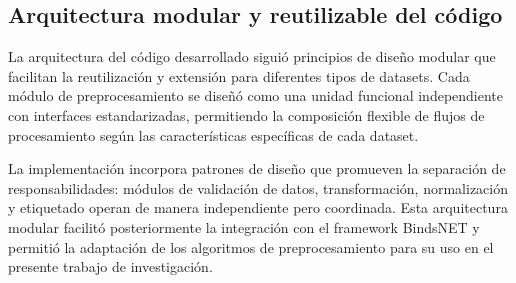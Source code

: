 \subsection{Arquitectura modular y reutilizable del código}

La arquitectura del código desarrollado siguió principios de diseño modular que facilitan la reutilización y extensión para diferentes tipos de datasets. Cada módulo de preprocesamiento se diseñó como una unidad funcional independiente con interfaces estandarizadas, permitiendo la composición flexible de flujos de procesamiento según las características específicas de cada dataset. 

La implementación incorpora patrones de diseño que promueven la separación de responsabilidades: módulos de validación de datos, transformación, normalización y etiquetado operan de manera independiente pero coordinada. Esta arquitectura modular facilitó posteriormente la integración con el framework BindsNET y permitió la adaptación de los algoritmos de preprocesamiento para su uso en el presente trabajo de investigación.
